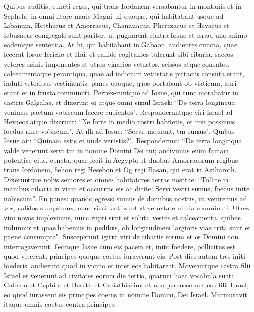 \begin{biblechapter}  
\verse Quibus auditis, cuncti reges, qui trans Iordanem versabantur in montanis et in Sephela, in omni litore maris Magni, hi quoque, qui habitabant usque ad Libanum, Hetthaeus et Amorraeus, Chananaeus, Pherezaeus et Hevaeus et Iebusaeus 
\verse congregati sunt pariter, ut pugnarent contra Iosue et Israel uno animo eademque sententia. 
\verse At hi, qui habitabant in Gabaon, audientes cuncta, quae fecerat Iosue Iericho et Hai, 
\verse et callide cogitantes tulerunt sibi cibaria, saccos veteres asinis imponentes et utres vinarios vetustos, scissos atque consutos, 
\verse calceamentaque perantiqua, quae ad indicium vetustatis pittaciis consuta erant, induti veteribus vestimentis; panes quoque, quos portabant ob viaticum, duri erant et in frusta comminuti. 
\verse Perrexeruntque ad Iosue, qui tunc morabatur in castris Galgalae, et dixerunt ei atque omni simul Israeli: “De terra longinqua venimus pactum vobiscum facere cupientes". Responderuntque viri Israel ad Hevaeos atque dixerunt: 
\verse “Ne forte in medio nostri habitetis, et non possimus foedus inire vobiscum". 
\verse At illi ad Iosue: “Servi, inquiunt, tui sumus". Quibus Iosue ait: “Quinam estis et unde venistis?". 
\verse Responderunt: “De terra longinqua valde venerunt servi tui in nomine Domini Dei tui; audivimus enim famam potentiae eius, cuncta, quae fecit in Aegypto 
\verse et duobus Amorraeorum regibus trans Iordanem, Sehon regi Hesebon et Og regi Basan, qui erat in Astharoth. 
\verse Dixeruntque nobis seniores et omnes habitatores terrae nostrae: “Tollite in manibus cibaria in viam et occurrite eis ac dicite: Servi vestri sumus; foedus inite nobiscum”. 
\verse En panes: quando egressi sumus de domibus nostris, ut veniremus ad vos, calidos sumpsimus; nunc sicci facti sunt et vetustate nimia comminuti. 
\verse Utres vini novos implevimus, nunc rupti sunt et soluti; vestes et calceamenta, quibus induimur et quae habemus in pedibus, ob longitudinem largioris viae trita sunt et paene consumpta". 
\verse Susceperunt igitur viri de cibariis eorum et os Domini non interrogaverunt. 
\verse Fecitque Iosue cum eis pacem et, inito foedere, pollicitus est quod viverent; principes quoque coetus iuraverunt eis. 
\verse Post dies autem tres initi foederis, audierunt quod in vicino et inter eos habitarent. 
\verse Moveruntque castra filii Israel et venerunt ad civitates eorum die tertio, quarum haec vocabula sunt: Gabaon et Cephira et Beroth et Cariathiarim; 
\verse et non percusserunt eos filii Israel, eo quod iurassent eis principes coetus in nomine Domini, Dei Israel. Murmuravit itaque omnis coetus contra principes, 

\end{biblechapter}
